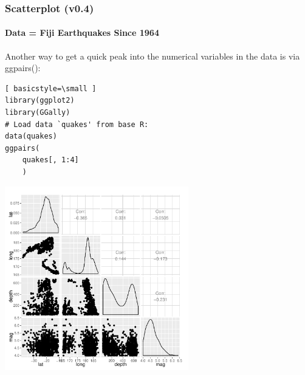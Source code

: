 \begin{frame}
\frametitle{Scatterplot (v0.4)}
  \framesubtitle{Data = Fiji Earthquakes Since 1964}

Another way to get a quick peak into the numerical variables in the data is via \ttfamily ggpairs(): \normalfont
  		\begin{lstlisting}[ basicstyle=\small ]
library(ggplot2)
library(GGally)
# Load data `quakes' from base R:
data(quakes)
ggpairs(
	quakes[, 1:4]
	)
		\end{lstlisting}

        \begin{center}
         \includegraphics[width=0.6\textwidth]{images/scatterPlot_v4.pdf}
        \end{center}
\end{frame}

